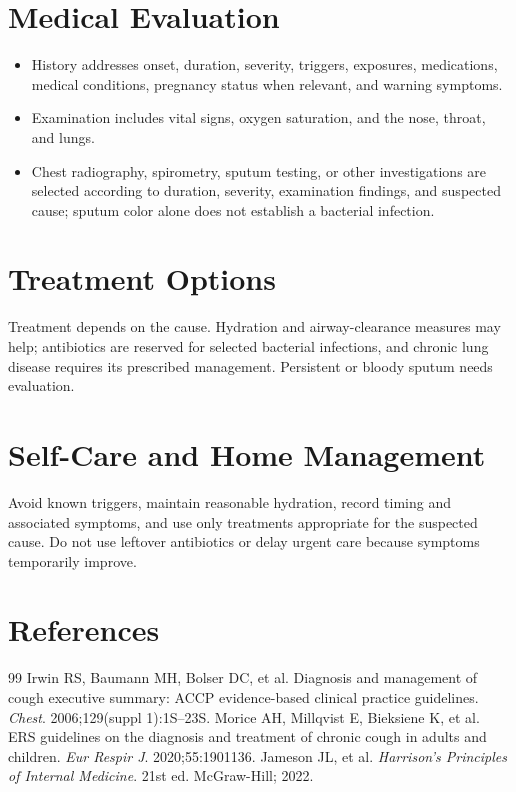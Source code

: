 \section*{Medical Evaluation}
\begin{itemize}
  \item History addresses onset, duration, severity, triggers, exposures, medications, medical conditions, pregnancy status when relevant, and warning symptoms.
  \item Examination includes vital signs, oxygen saturation, and the nose, throat, and lungs.
  \item Chest radiography, spirometry, sputum testing, or other investigations are selected according to duration, severity, examination findings, and suspected cause; sputum color alone does not establish a bacterial infection.
\end{itemize}

\section*{Treatment Options}
Treatment depends on the cause. Hydration and airway-clearance measures may help; antibiotics are reserved for selected bacterial infections, and chronic lung disease requires its prescribed management. Persistent or bloody sputum needs evaluation.

\section*{Self-Care and Home Management}
Avoid known triggers, maintain reasonable hydration, record timing and associated symptoms, and use only treatments appropriate for the suspected cause. Do not use leftover antibiotics or delay urgent care because symptoms temporarily improve.

\section*{References}
\begin{thebibliography}{99}
 Irwin RS, Baumann MH, Bolser DC, et al. Diagnosis and management of cough executive summary: ACCP evidence-based clinical practice guidelines. \textit{Chest}. 2006;129(suppl 1):1S--23S.
 Morice AH, Millqvist E, Bieksiene K, et al. ERS guidelines on the diagnosis and treatment of chronic cough in adults and children. \textit{Eur Respir J}. 2020;55:1901136.
 Jameson JL, et al. \textit{Harrison's Principles of Internal Medicine}. 21st ed. McGraw-Hill; 2022.
\end{thebibliography}
